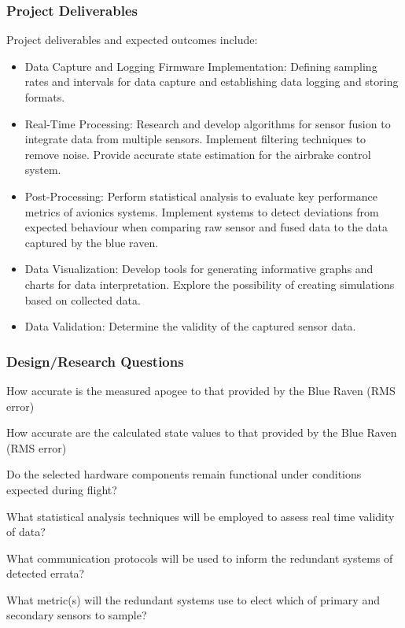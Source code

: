 \subsubsection{Project Deliverables}
Project deliverables and expected outcomes include:  
\begin{itemize}
  \item Data Capture and Logging Firmware Implementation: Defining sampling rates and intervals for data capture and establishing data logging and storing formats. 
  \item Real-Time Processing: Research and develop algorithms for sensor fusion to integrate data from multiple sensors. Implement filtering techniques to remove noise. Provide accurate state estimation for the airbrake control system. 
  \item Post-Processing: Perform statistical analysis to evaluate key performance metrics of avionics systems. Implement systems to detect deviations from expected behaviour when comparing raw sensor and fused data to the data captured by the blue raven. 
  \item Data Visualization: Develop tools for generating informative graphs and charts for data interpretation. Explore the possibility of creating simulations based on collected data. 
  \item Data Validation: Determine the validity of the captured sensor data.  
\end{itemize}

\subsubsection{Design/Research Questions}
\begin{questions}
  \item How accurate is the measured apogee to that provided by the Blue Raven (RMS error)
  \item How accurate are the calculated state values to that provided by the Blue Raven (RMS error)
  \item Do the selected hardware components remain functional under conditions expected during flight?
  \item What statistical analysis techniques will be employed to assess real time validity of data? \begin{questions}
    \item What communication protocols will be used to inform the redundant systems of detected errata?
    \item What metric(s) will the redundant systems use to elect which of primary and secondary sensors to sample?
  \end{questions}
\end{questions}

